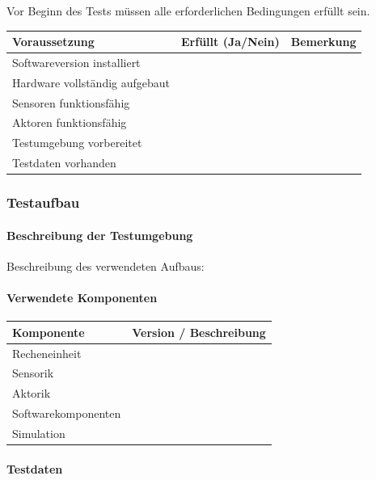 Vor Beginn des Tests müssen alle erforderlichen Bedingungen erfüllt
sein.

\begin{longtable}[]{@{}lll@{}}
\toprule\noalign{}
Voraussetzung & Erfüllt (Ja/Nein) & Bemerkung \\
\midrule\noalign{}
\endhead
\bottomrule\noalign{}
\endlastfoot
Softwareversion installiert & & \\
Hardware vollständig aufgebaut & & \\
Sensoren funktionsfähig & & \\
Aktoren funktionsfähig & & \\
Testumgebung vorbereitet & & \\
Testdaten vorhanden & & \\
\end{longtable}

\subsubsection{Testaufbau}\label{testaufbau-9}

\paragraph{Beschreibung der
Testumgebung}\label{beschreibung-der-testumgebung}

Beschreibung des verwendeten Aufbaus:

\paragraph{Verwendete Komponenten}\label{verwendete-komponenten}

\begin{longtable}[]{@{}ll@{}}
\toprule\noalign{}
Komponente & Version / Beschreibung \\
\midrule\noalign{}
\endhead
\bottomrule\noalign{}
\endlastfoot
Recheneinheit & \\
Sensorik & \\
Aktorik & \\
Softwarekomponenten & \\
Simulation & \\
\end{longtable}

\paragraph{Testdaten}\label{testdaten}

